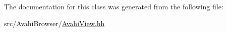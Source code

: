 \-The documentation for this class was generated from the following file\-:\begin{DoxyCompactItemize}
\item 
src/\-Avahi\-Browser/\hyperlink{AvahiView_8hh}{\-Avahi\-View.\-hh}\end{DoxyCompactItemize}
